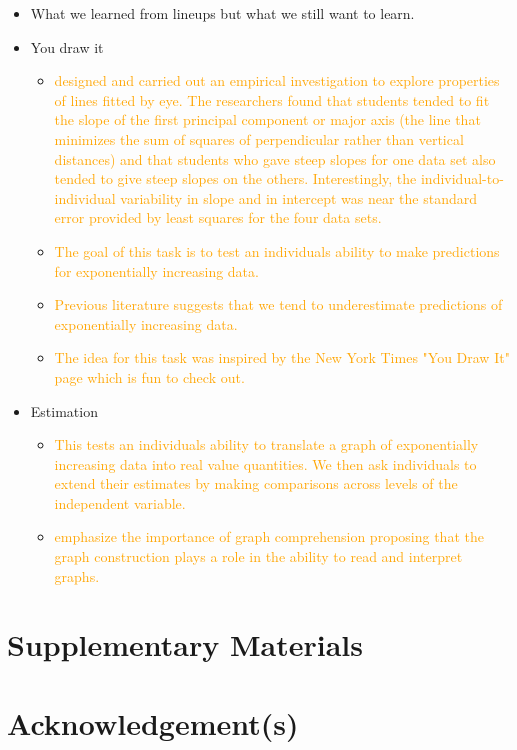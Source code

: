 \documentclass[]{interact}
\theoremstyle{plain}%
\theoremstyle{definition}
\theoremstyle{remark}
\begin{document}
\begin{itemize}
\item
  What we learned from lineups but what we still want to learn.
\item
  You draw it

  \begin{itemize}
  \item
    \textcolor{Orange}{\citep{mosteller_eye_1981} designed and carried out an empirical investigation to explore properties of lines fitted by eye. The researchers found that students tended to fit the slope of the first principal component or major axis (the line that minimizes the sum of squares of perpendicular rather than vertical distances) and that students who gave steep slopes for one data set also tended to give steep slopes on the others. Interestingly, the individual-to-individual variability in slope and in intercept was near the standard error provided by least squares for the four data sets.}
  \item
    \textcolor{Orange}{The goal of this task is to test an individuals ability to make predictions for exponentially increasing data.}
  \item
    \textcolor{Orange}{Previous literature suggests that we tend to underestimate predictions of exponentially increasing data.\citep{jones_generalized_1979, jones_polynomial_1977, wagenaar_extrapolation_1978}}
  \item
    \textcolor{Orange}{The idea for this task was inspired by the New York Times "You Draw It" page which is fun to check out.}
  \end{itemize}
\item
  Estimation

  \begin{itemize}
  \item
    \textcolor{Orange}{This tests an individuals ability to translate a graph of exponentially increasing data into real value quantities. We then ask individuals to extend their estimates by making comparisons across levels of the independent variable.}
  \item
    \textcolor{Orange}{\citep{friel_making_2001} emphasize the importance of graph comprehension proposing that the graph construction plays a role in the ability to read and interpret graphs.}
  \end{itemize}
\end{itemize}

\hypertarget{supplementary-materials}{%
\section*{Supplementary Materials}\label{supplementary-materials}}

\hypertarget{acknowledgements}{%
\section*{Acknowledgement(s)}\label{acknowledgements}}



\end{document}
